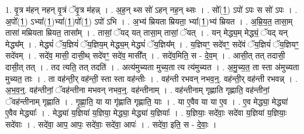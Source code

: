 \documentclass[17pt]{extarticle}
\begin{document}
1. वृ॒त्र म॑हन् नहन् वृ॒त्रं ॅवृ॒त्र म॑हन्न् । . अ॒ह॒न् थ्स सो॑ ऽहन् नह॒न् थ्सः । . सो᳚(1॒) ऽपो॑ ऽपः स सो॑ ऽपः । . अ॒पो᳚(1॒) ऽभ्या᳚(1॒)भ्या᳚(1॒)पो᳚(1॒) ऽपो॑ ऽभि । . अ॒भ्य॑ म्रियता म्रियता॒ भ्या᳚(1॒)भ्य॑ म्रियत । . अ॒म्रि॒य॒त॒ तासा॒म् तासा॑ मम्रियता म्रियत॒ तासा᳚म् । . तासां॒ ॅयद् यत् तासा॒म् तासां॒ ॅयत् । . यन् मेद्ध्य॒म् मेद्ध्यं॒ ॅयद् यन् मेद्ध्य᳚म् । . मेद्ध्यं॑ ॅय॒ज्ञियं॑ ॅय॒ज्ञिय॒म् मेद्ध्य॒म् मेद्ध्यं॑ ॅय॒ज्ञिय᳚म् । . य॒ज्ञियꣳ॒॒ सदे॑वꣳ॒॒ सदे॑वं ॅय॒ज्ञियं॑ ॅय॒ज्ञियꣳ॒॒ सदे॑वम् । . सदे॑व॒ मासी॒ दासी॒थ् सदे॑वꣳ॒॒ सदे॑व॒ मासी᳚त् । . सदे॑व॒मिति॒ स - दे॒व॒म् । . आसी॒त् तत् तदासी॒ दासी॒त् तत् । . तद त्यति॒ तत् तदति॑ । . अत्य॑मुच्यता मुच्य॒ता त्य त्य॑मुच्यत । . अ॒मु॒च्य॒त॒ ता स्ता अ॑मुच्यता मुच्यत॒ ताः । . ता वह॑न्ती॒र् वह॑न्ती॒ स्ता स्ता वह॑न्तीः । . वह॑न्ती रभवन् नभव॒न्॒. वह॑न्ती॒र् वह॑न्ती रभवन्न् । . अ॒भ॒व॒न्॒. वह॑न्तीनां॒ ॅवह॑न्तीना मभवन् नभव॒न्॒. वह॑न्तीनाम् । . वह॑न्तीनाम् गृह्णाति गृह्णाति॒ वह॑न्तीनां॒ ॅवह॑न्तीनाम् गृह्णाति । . गृ॒ह्णा॒ति॒ या या गृ॑ह्णाति गृह्णाति॒ याः । . या ए॒वैव या या ए॒व । . ए॒व मेद्ध्या॒ मेद्ध्या॑ ए॒वैव मेद्ध्याः᳚ । . मेद्ध्या॑ य॒ज्ञिया॑ य॒ज्ञिया॒ मेद्ध्या॒ मेद्ध्या॑ य॒ज्ञियाः᳚ । . य॒ज्ञियाः॒ सदे॑वाः॒ सदे॑वा य॒ज्ञिया॑ य॒ज्ञियाः॒ सदे॑वाः । . सदे॑वा॒ आप॒ आपः॒ सदे॑वाः॒ सदे॑वा॒ आपः॑ । . सदे॑वा॒ इति॒ स - दे॒वाः॒ । \newline
\end{document}
